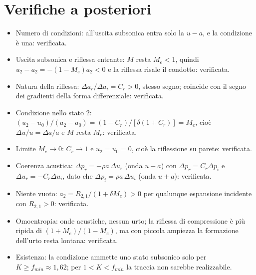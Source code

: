 \documentclass[11pt,a4paper]{article}
\newcommand{\uma}{u-a}
\newcommand{\upa}{u+a}
\newcommand{\Me}{M_e}
\newcommand{\Cr}{C_r}
\begin{document}
\section{Verifiche a posteriori}
\begin{itemize}
  \item Numero di condizioni: all'uscita subsonica entra solo la $\uma$, e la condizione è una: verificata.
  \item Uscita subsonica e riflessa entrante: $M$ resta $\Me<1$, quindi $u_2-a_2=-(1-\Me)a_2<0$ e la riflessa
        risale il condotto: verificata.
  \item Natura della riflessa: $\Delta a_r/\Delta a_i=\Cr>0$, stesso segno; coincide con il segno dei gradienti
        della forma differenziale: verificata.
  \item Condizione nello stato 2: $(u_2-u_0)/(a_2-a_0)=(1-\Cr)/[\delta(1+\Cr)]=\Me$, cioè $\Delta u/u=\Delta a/a$ e
        $M$ resta $\Me$: verificata.
  \item Limite $\Me\to0$: $\Cr\to1$ e $u_2=u_0=0$, cioè la riflessione su parete: verificata.
  \item Coerenza acustica: $\Delta p_r=-\rho a\,\Delta u_r$ (onda $\uma$) con $\Delta p_r=\Cr\Delta p_i$ e
        $\Delta u_r=-\Cr\Delta u_i$, dato che $\Delta p_i=\rho a\,\Delta u_i$ (onda $\upa$): verificata.
  \item Niente vuoto: $a_2=R_{2,1}/(1+\delta\Me)>0$ per qualunque espansione incidente con $R_{2,1}>0$: verificata.
  \item Omoentropia: onde acustiche, nessun urto; la riflessa di compressione è più ripida di $(1+\Me)/(1-\Me)$,
        ma con piccola ampiezza la formazione dell'urto resta lontana: verificata.
  \item Esistenza: la condizione ammette uno stato subsonico solo per $K\ge f_{min}\approx1{,}62$; per
        $1<K<f_{min}$ la traccia non sarebbe realizzabile.
\end{itemize}

\end{document}
